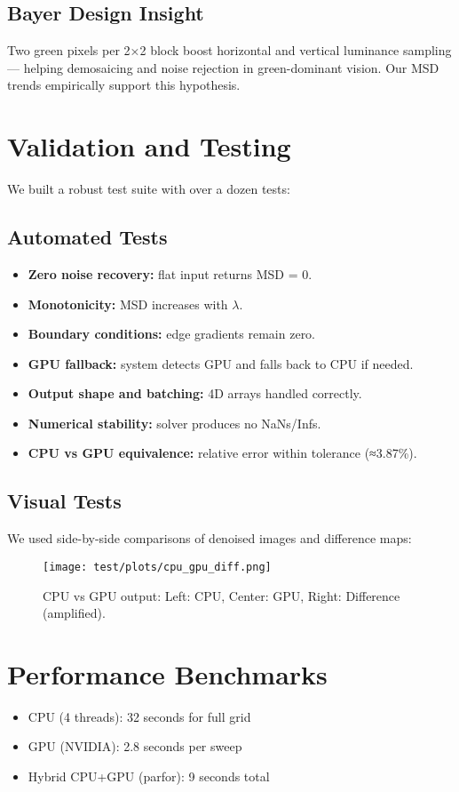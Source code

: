 \documentclass[11pt]{article}
\begin{document}
\subsection*{Bayer Design Insight}
Two green pixels per 2×2 block boost horizontal and vertical luminance sampling — helping demosaicing and noise rejection in green-dominant vision. Our MSD trends empirically support this hypothesis.

\section*{Validation and Testing}
We built a robust test suite with over a dozen tests:

\subsection*{Automated Tests}
\begin{itemize}
  \item \textbf{Zero noise recovery:} flat input returns MSD = 0.
  \item \textbf{Monotonicity:} MSD increases with \(\lambda\).
  \item \textbf{Boundary conditions:} edge gradients remain zero.
  \item \textbf{GPU fallback:} system detects GPU and falls back to CPU if needed.
  \item \textbf{Output shape and batching:} 4D arrays handled correctly.
  \item \textbf{Numerical stability:} solver produces no NaNs/Infs.
  \item \textbf{CPU vs GPU equivalence:} relative error within tolerance (≈3.87\%).
\end{itemize}

\subsection*{Visual Tests}
We used side-by-side comparisons of denoised images and difference maps:

\begin{figure}[h]
    \centering
    \texttt{[image: test/plots/cpu\_gpu\_diff.png]}
    \caption{CPU vs GPU output: Left: CPU, Center: GPU, Right: Difference (amplified).}
\end{figure}

\section*{Performance Benchmarks}
\begin{itemize}
  \item CPU (4 threads): 32 seconds for full grid
  \item GPU (NVIDIA): 2.8 seconds per sweep
  \item Hybrid CPU+GPU (parfor): 9 seconds total
\end{itemize}
\end{document}
